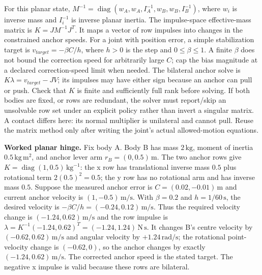 For this planar state, \(M^{-1}=\operatorname{diag}(w_A,w_A,I_A^{-1},w_B,w_B,I_B^{-1})\), where \(w_i\) is inverse mass and \(I_i^{-1}\) is inverse planar inertia. The impulse-space effective-mass matrix is \(K=JM^{-1}J^T\). It maps a vector of row impulses into changes in the constrained anchor speeds. For a joint with position error, a simple stabilization target is \(v_{target}=-\beta C/h\), where \(h>0\) is the step and \(0\le\beta\le1\). A finite \(\beta\) does not bound the correction speed for arbitrarily large \(C\); cap the bias magnitude at a declared correction-speed limit when needed. The bilateral anchor solve is \(K\lambda=v_{target}-JV\); its impulses may have either sign because an anchor can pull or push. Check that \(K\) is finite and sufficiently full rank before solving. If both bodies are fixed, or rows are redundant, the solver must report/skip an unsolvable row set under an explicit policy rather than invert a singular matrix. A contact differs here: its normal multiplier is unilateral and cannot pull. Reuse the matrix method only after writing the joint's actual allowed-motion equations.

\textbf{Worked planar hinge.} Fix body A. Body B has mass \(2\,\mathrm{kg}\), moment of inertia \(0.5\,\mathrm{kg\,m^2}\), and anchor lever arm \(r_B=(0,0.5)\,\mathrm m\). The two anchor rows give \(K=\operatorname{diag}(1,0.5)\,\mathrm{kg}^{-1}\): the x row has translational inverse mass \(0.5\) plus rotational term \(2(0.5)^2=0.5\); the y row has no rotational arm and has inverse mass \(0.5\). Suppose the measured anchor error is \(C=(0.02,-0.01)\,\mathrm m\) and current anchor velocity is \((1,-0.5)\,\mathrm{m/s}\). With \(\beta=0.2\) and \(h=1/60\,\mathrm s\), the desired velocity is \(-\beta C/h=(-0.24,0.12)\,\mathrm{m/s}\). Thus the required velocity change is \((-1.24,0.62)\,\mathrm{m/s}\) and the row impulse is \(\lambda=K^{-1}(-1.24,0.62)^T=(-1.24,1.24)\,\mathrm{N\,s}\). It changes B's centre velocity by \((-0.62,0.62)\,\mathrm{m/s}\) and angular velocity by \(+1.24\,\mathrm{rad/s}\); the rotational point-velocity change is \((-0.62,0)\), so the anchor changes by exactly \((-1.24,0.62)\,\mathrm{m/s}\). The corrected anchor speed is the stated target. The negative x impulse is valid because these rows are bilateral.

